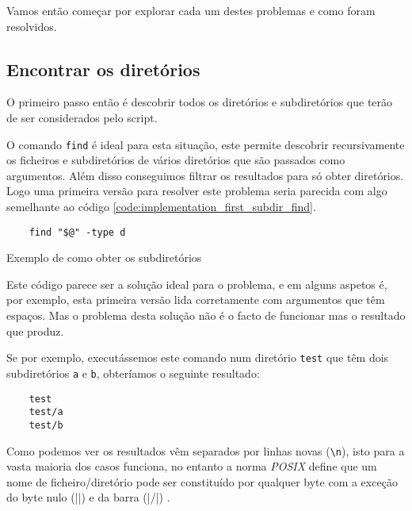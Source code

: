 Vamos então começar por explorar cada um destes problemas e como foram resolvidos.

\subsection{Encontrar os diretórios}\label{sec:implementation_find_dirs}

O primeiro passo então é descobrir todos os diretórios e subdiretórios que terão
de ser considerados pelo script.

O comando \Verb|find| é ideal para esta situação, este permite descobrir
recursivamente os ficheiros e subdiretórios de vários diretórios que são
passados como argumentos. Além disso conseguimos filtrar os resultados para só
obter diretórios. Logo uma primeira versão para resolver este problema seria
parecida com algo semelhante ao código
\ref{code:implementation_first_subdir_find}.

\begin{listing}[H]
	\centering
	\begin{verbatim}
    find "$@" -type d
  \end{verbatim}
	\caption{Exemplo de como obter os subdiretórios}
	\label{code:implementation_first_subdir_find}
\end{listing}

Este código parece ser a solução ideal para o problema, e em alguns aspetos é,
por exemplo, esta primeira versão lida corretamente com argumentos que têm
espaços. Mas o problema desta solução não é o facto de funcionar mas o resultado
que produz.

Se por exemplo, executássemos este comando num diretório \Verb|test| que têm
dois subdiretórios \Verb|a| e \Verb|b|, obteríamos o seguinte resultado:

\begin{listing}[H]
	\centering
	\begin{verbatim}
    test
    test/a
    test/b
  \end{verbatim}
	\cprotect\caption{Exemplo do resutlado obtido pelo \Verb|find|}
\end{listing}

Como podemos ver os resultados vêm separados por linhas novas (\Verb|\n|), isto
para a vasta maioria dos casos funciona, no entanto a norma \emph{POSIX} define
que um nome de ficheiro/diretório pode ser constituído por qualquer byte com a
exceção do byte nulo (\bashinline|\0|) e da barra (\bashinline|/|)
\cite[60]{posix}.

